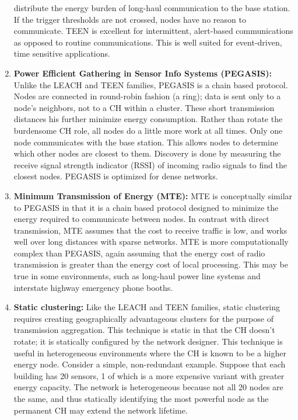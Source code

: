 \begin{enumerate}
  distribute the energy burden of long-haul communication to the base station.
  If the trigger thresholds are not crossed, nodes have no reason to
  communicate. TEEN is excellent for intermittent, alert-based communications
  as opposed to routine communications. This is well suited for event-driven,
  time sensitive applications.
  \item \textbf{Power Efficient Gathering in Sensor Info Systems (PEGASIS):}
  Unlike the LEACH and TEEN families, PEGASIS is a chain based protocol. Nodes
  are connected in round-robin fashion (a ring); data is sent only to a node's
  neighbors, not to a CH within a cluster. These short transmission distances
  his further minimize energy consumption. Rather than rotate the burdensome
  CH role, all nodes do a little more work at all times. Only one node
  communicates with the base station. This allows nodes to determine which
  other nodes are closest to them. Discovery is done by measuring the receive
  signal strength indicator (RSSI) of incoming radio signals to find the
  closest nodes. PEGASIS is optimized for dense networks.
  \item \textbf{Minimum Transmission of Energy (MTE):} MTE is conceptually
  similar to PEGASIS in that it is a chain based protocol designed to minimize
  the energy required to communicate between nodes. In contrast with direct
  transmission, MTE assumes that the cost to receive traffic is low, and works
  well over long distances with sparse networks. MTE is more computationally
  complex than PEGASIS, again assuming that the energy cost of radio
  transmission is greater than the energy cost of local processing. This may
  be true in some environments, such as long-haul power line systems and
  interstate highway emergency phone booths.
  \item \textbf{Static clustering:} Like the LEACH and TEEN families, static
  clustering requires creating geographically advantageous clusters for the
  purpose of transmission aggregation. This technique is static in that the CH
  doesn't rotate; it is statically configured by the network designer. This
  technique is useful in heterogeneous environments where the CH is known to
  be a higher energy node. Consider a simple, non-redundant example. Suppose
  that each building has 20 sensors, 1 of which is a more expensive variant
  with greater energy capacity. The network is heterogeneous because not all
  20 nodes are the same, and thus statically identifying the most powerful
  node as the permanent CH may extend the network lifetime.

\end{enumerate}
